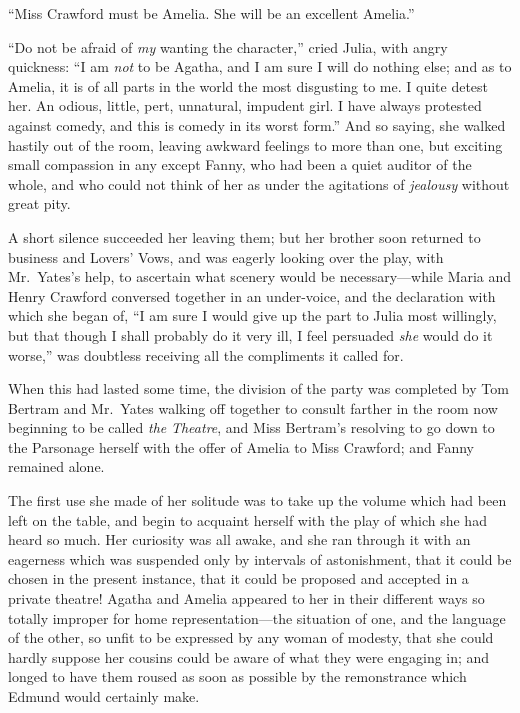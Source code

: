 ``Miss Crawford must be Amelia.  She will be an excellent Amelia.''

``Do not be afraid of \emph{my} wanting the character,''
cried Julia, with angry quickness:  ``I am \emph{not} to be Agatha,
and I am sure I will do nothing else; and as to Amelia,
it is of all parts in the world the most disgusting to me.
I quite detest her.  An odious, little, pert, unnatural,
impudent girl.  I have always protested against comedy,
and this is comedy in its worst form.''  And so saying,
she walked hastily out of the room, leaving awkward feelings
to more than one, but exciting small compassion in any
except Fanny, who had been a quiet auditor of the whole,
and who could not think of her as under the agitations of
\emph{jealousy} without great pity.

A short silence succeeded her leaving them; but her brother
soon returned to business and Lovers' Vows, and was
eagerly looking over the play, with Mr.\ Yates's help,
to ascertain what scenery would be necessary---while Maria
and Henry Crawford conversed together in an under-voice,
and the declaration with which she began of, ``I am
sure I would give up the part to Julia most willingly,
but that though I shall probably do it very ill,
I feel persuaded \emph{she} would do it worse,'' was doubtless
receiving all the compliments it called for.

When this had lasted some time, the division of the party
was completed by Tom Bertram and Mr.\ Yates walking off
together to consult farther in the room now beginning
to be called \emph{the} \emph{Theatre}, and Miss Bertram's resolving
to go down to the Parsonage herself with the offer
of Amelia to Miss Crawford; and Fanny remained alone.

The first use she made of her solitude was to take up
the volume which had been left on the table, and begin
to acquaint herself with the play of which she had heard
so much.  Her curiosity was all awake, and she ran
through it with an eagerness which was suspended only
by intervals of astonishment, that it could be chosen
in the present instance, that it could be proposed
and accepted in a private theatre!  Agatha and Amelia
appeared to her in their different ways so totally
improper for home representation---the situation of one,
and the language of the other, so unfit to be expressed
by any woman of modesty, that she could hardly suppose
her cousins could be aware of what they were engaging in;
and longed to have them roused as soon as possible
by the remonstrance which Edmund would certainly make.




